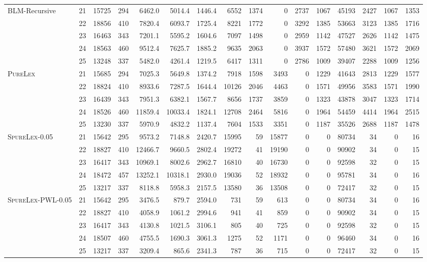 \documentclass{article}
\begin{document}
\begin{table}[htb]
\begin{tabular}{l|c|rr|rrr|rrrrrr|rrr}
\hline
BLM-Recursive & 21 & 15725 & 294 & 6462.0 & 5014.4 & 1446.4 &  6552 & 1374 & 0 & 2737 & 1067 & 45193 & 2427 & 1067 & 1353 \\
& 22 & 18856 & 410 & 7820.4 & 6093.7 & 1725.4 &  8221 & 1772 & 0 & 3292 & 1385 & 53663 & 3123 & 1385 & 1716 \\
& 23 & 16463 & 343 & 7201.1 & 5595.2 & 1604.6 &  7097 & 1498 & 0 & 2959 & 1142 & 47527 & 2626 & 1142 & 1475 \\
& 24 & 18563 & 460 & 9512.4 & 7625.7 & 1885.2 &  9635 & 2063 & 0 & 3937 & 1572 & 57480 & 3621 & 1572 & 2069 \\
& 25 & 13248 & 337 & 5482.0 & 4261.4 & 1219.5 &  6417 & 1311 & 0 & 2786 & 1009 & 39407 & 2288 & 1009 & 1256 \\

\hline
\textsc{PureLex} & 21 & 15685 & 294 & 7025.3 & 5649.8 & 1374.2 &  7918 & 1598 & 3493 & 0 & 1229 & 41643 & 2813 & 1229 & 1577 \\
& 22 & 18824 & 410 & 8933.6 & 7287.5 & 1644.4 &  10126 & 2046 & 4463 & 0 & 1571 & 49956 & 3583 & 1571 & 1990 \\
& 23 & 16439 & 343 & 7951.3 & 6382.1 & 1567.7 &  8656 & 1737 & 3859 & 0 & 1323 & 43878 & 3047 & 1323 & 1714 \\
& 24 & 18526 & 460 & 11859.4 & 10033.4 & 1824.1 &  12708 & 2464 & 5816 & 0 & 1964 & 54459 & 4414 & 1964 & 2515 \\
& 25 & 13230 & 337 & 5970.9 & 4832.2 & 1137.4 &  7604 & 1533 & 3351 & 0 & 1187 & 35526 & 2688 & 1187 & 1478 \\

\hline
\textsc{SpureLex}-0.05 & 21 & 15642 & 295 & 9573.2 & 7148.8 & 2420.7 &  15995 & 59 & 15877 & 0 & 0 & 80734 & 34 & 0 & 16 \\
& 22 & 18827 & 410 & 12466.7 & 9660.5 & 2802.4 &  19272 & 41 & 19190 & 0 & 0 & 90902 & 34 & 0 & 15 \\
& 23 & 16417 & 343 & 10969.1 & 8002.6 & 2962.7 &  16810 & 40 & 16730 & 0 & 0 & 92598 & 32 & 0 & 15 \\
& 24 & 18472 & 457 & 13252.1 & 10318.1 & 2930.0 &  19036 & 52 & 18932 & 0 & 0 & 95781 & 34 & 0 & 16 \\
& 25 & 13217 & 337 & 8118.8 & 5958.3 & 2157.5 &  13580 & 36 & 13508 & 0 & 0 & 72417 & 32 & 0 & 15 \\
\hline

\textsc{SpureLex-PWL}-0.05 & 21 & 15642 & 295 & 3476.5 & 879.7 & 2594.0 &  731 & 59 & 613 & 0 & 0 & 80734 & 34 & 0 & 16 \\
& 22 & 18827 & 410 & 4058.9 & 1061.2 & 2994.6 &  941 & 41 & 859 & 0 & 0 & 90902 & 34 & 0 & 15 \\
& 23 & 16417 & 343 & 4130.8 & 1021.5 & 3106.1 &  805 & 40 & 725 & 0 & 0 & 92598 & 32 & 0 & 15 \\
& 24 & 18507 & 460 & 4755.5 & 1690.3 & 3061.3 &  1275 & 52 & 1171 & 0 & 0 & 96460 & 34 & 0 & 16 \\
& 25 & 13217 & 337 & 3209.4 & 865.6 & 2341.3 &  787 & 36 & 715 & 0 & 0 & 72417 & 32 & 0 & 15 \\


\end{tabular}
\end{table}
\end{document}
